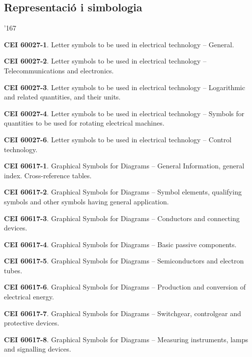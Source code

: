 \subsection*{Representaci\'{o} i simbologia}
\begin{dinglist}{'167}
    \item \textbf{CEI 60027-1}. Letter symbols to be used in electrical technology -- General.
    \item \textbf{CEI 60027-2}. Letter symbols to be used in electrical technology -- Telecommunications and electronics.
    \item \textbf{CEI 60027-3}. Letter symbols to be used in electrical technology -- Logarithmic and related quantities, and their units.
    \item \textbf{CEI 60027-4}. Letter symbols to be used in electrical technology -- Symbols for quantities to be used for rotating electrical machines.
    \item \textbf{CEI 60027-6}. Letter symbols to be used in electrical technology -- Control technology.
    \item \textbf{CEI 60617-1}. Graphical Symbols for Diagrams -- General Information, general index. Cross-reference tables.
    \item \textbf{CEI 60617-2}. Graphical Symbols for Diagrams -- Symbol elements, qualifying symbols and other symbols having general application.
    \item \textbf{CEI 60617-3}. Graphical Symbols for Diagrams -- Conductors and connecting devices.
    \item \textbf{CEI 60617-4}. Graphical Symbols for Diagrams -- Basic passive components.
    \item \textbf{CEI 60617-5}. Graphical Symbols for Diagrams -- Semiconductors and electron tubes.
    \item \textbf{CEI 60617-6}. Graphical Symbols for Diagrams -- Production and conversion of electrical energy.
    \item \textbf{CEI 60617-7}. Graphical Symbols for Diagrams -- Switchgear, controlgear and protective devices.
     \item \textbf{CEI 60617-8}. Graphical Symbols for Diagrams -- Measuring instruments, lamps and signalling devices.

\end{dinglist}
